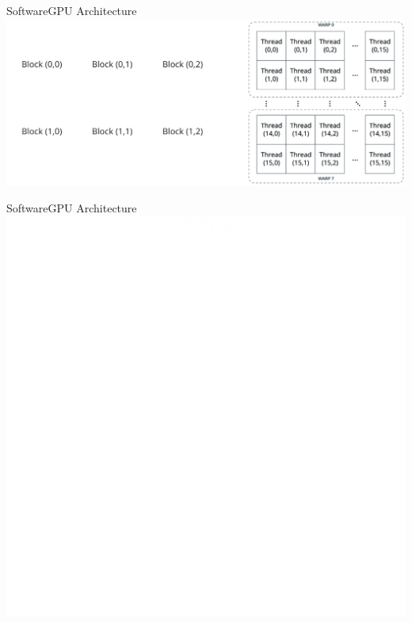 \begin{frame}{Software}{GPU Architecture}
	\centering
	\includegraphics[width=0.9\paperwidth]{gfx/cudagrid}
\end{frame}

\begin{frame}{Software}{GPU Architecture}
\centering
\includegraphics[height=0.7\paperheight]{gfx/owncudagrid}
\end{frame}




